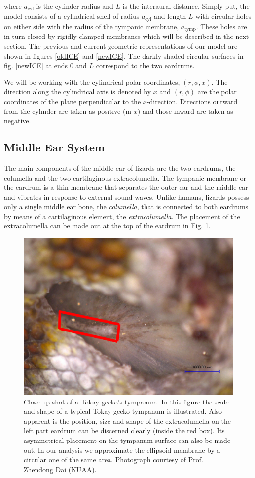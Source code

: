 where $a_{\mathrm{cyl}}$ is the cylinder radius and $L$ is the interaural distance. Simply put, the model consists of a cylindrical shell
of radius $a_{\mathrm{cyl}}$ and length $L$ with circular holes on either side with the radius of the tympanic membrane, $a_{\mathrm{tymp}}$. These
holes are in turn closed by rigidly clamped membranes which will be described in the next section. The previous and current geometric representations
of our model are shown in figures \ref{oldICE} and \ref{newICE}. The darkly shaded circular surfaces in fig. \ref{newICE} at ends $0$ and $L$ correspond to the two
eardrums.

We will be working with the cylindrical polar coordinates, $(r,\phi,x)$. The direction
along the cylindrical axis is denoted by $x$ and $(r,\phi)$ are the polar coordinates of the plane perpendicular to the $x$-direction. 
Directions outward from the cylinder are taken as positive (in $x$) and those inward are taken as negative.
\subsection{Middle Ear System}\label{middleear}
The main components of the middle-ear of lizards are the two eardrums, the columella and the two cartilaginous extracolumella.  
The tympanic membrane or the eardrum is a thin membrane that separates the outer ear and the
middle ear and vibrates in response to external sound waves.  Unlike humans, lizards 
possess only a single middle ear bone, the \textit{columella},
that is connected to both eardrums by means of a cartilaginous element, the \textit{extracolumella}. The
placement of the extracolumella can be made out at the top of the eardrum in Fig. \ref{geckoextracolumella}.
\begin{figure}[ht]
 \centering
 \includegraphics[width=.7\linewidth]{Diagrams/geckoextracolumella.png}
 \caption[Extracolumella position on a gecko' ear.]{Close up shot of a Tokay gecko's tympanum. In this figure the scale and shape of a typical Tokay gecko tympanum
 is illustrated. Also apparent is the position, size
 and shape of the extracolumella on the left part eardrum can be discerned clearly (inside the red box). Its asymmetrical placement on the tympanum
 surface can also be made out. In our analysis we approximate the
 ellipsoid membrane by a circular one of the same area. Photograph courtesy of Prof. Zhendong Dai (NUAA).}
 \label{geckoextracolumella}
\end{figure}

